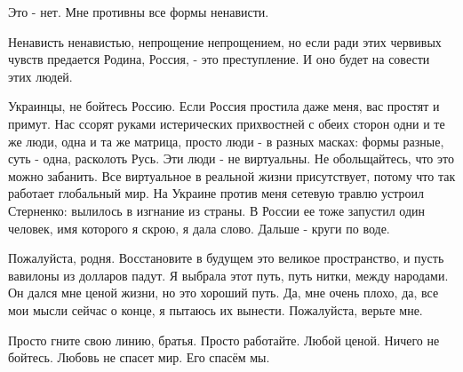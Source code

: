 Это - нет. Мне противны все формы ненависти.

Ненависть ненавистью, непрощение непрощением, но если ради этих червивых чувств
предается Родина, Россия, - это преступление. И оно будет на совести этих
людей.

Украинцы, не бойтесь Россию. Если Россия простила даже меня, вас простят и
примут. Нас ссорят руками истерических прихвостней с обеих сторон одни и те же
люди, одна и та же матрица, просто люди - в разных масках: формы разные, суть -
одна, расколоть Русь. Эти люди - не виртуальны. Не обольщайтесь, что это можно
забанить. Все виртуальное в реальной жизни присутствует, потому что так
работает глобальный мир. На Украине против меня сетевую травлю устроил
Стерненко: вылилось в изгнание из страны. В России ее тоже запустил один
человек, имя которого я скрою, я дала слово. Дальше - круги по воде.

Пожалуйста, родня. Восстановите в будущем это великое пространство, и пусть
вавилоны из долларов падут. Я выбрала этот путь, путь нитки, между народами. Он
дался мне ценой жизни, но это хороший путь. Да, мне очень плохо, да, все мои
мысли сейчас о конце, я пытаюсь их вынести. Пожалуйста, верьте мне.

Просто гните свою линию, братья. Просто работайте. Любой ценой. Ничего не
бойтесь. Любовь не спасет мир. Его спасём мы.

